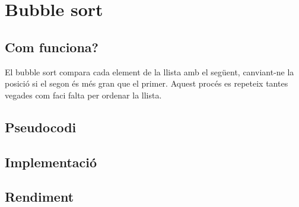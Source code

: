 \chapter{Bubble sort}

\section{Com funciona?}
El bubble sort compara cada element de la llista amb el següent, canviant-ne la posició si el segon és més gran que el primer.
Aquest procés es repeteix tantes vegades com faci falta per ordenar la llista.

\section{Pseudocodi}

\section{Implementació}


\section{Rendiment}
\noindent
\makebox[\textwidth][c]{
	
}
\vspace*{1em}
